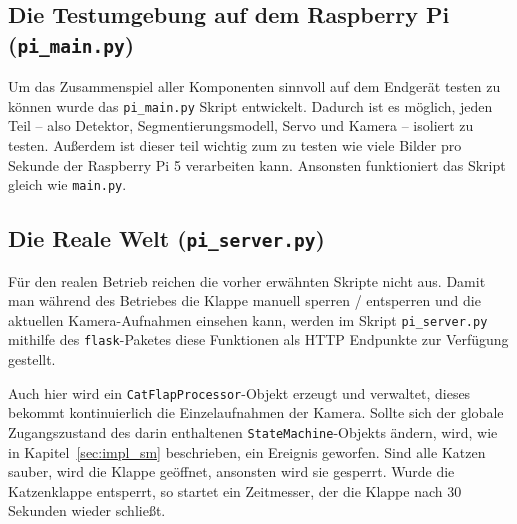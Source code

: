 \subsection{Die Testumgebung auf dem Raspberry Pi (\texttt{pi\_main.py})}
Um das Zusammenspiel aller Komponenten sinnvoll auf dem Endgerät testen zu können wurde das \texttt{pi\_main.py} Skript entwickelt. Dadurch ist es möglich, jeden Teil – also Detektor, Segmentierungsmodell, Servo und Kamera – isoliert zu testen. Außerdem ist dieser teil wichtig zum zu testen wie viele Bilder pro Sekunde der Raspberry Pi 5 verarbeiten kann. Ansonsten funktioniert das Skript gleich wie \texttt{main.py}.

\subsection{Die Reale Welt (\texttt{pi\_server.py})}
Für den realen Betrieb reichen die vorher erwähnten Skripte nicht aus. Damit man während des Betriebes die Klappe manuell sperren / entsperren und die aktuellen Kamera-Aufnahmen einsehen kann, werden im Skript \texttt{pi\_server.py} mithilfe des \texttt{flask}-Paketes diese Funktionen als HTTP Endpunkte zur Verfügung gestellt.

Auch hier wird ein \texttt{CatFlapProcessor}-Objekt erzeugt und verwaltet, dieses bekommt kontinuierlich die Einzelaufnahmen der Kamera. Sollte sich der globale Zugangszustand des darin enthaltenen \texttt{StateMachine}-Objekts ändern, wird, wie in Kapitel~\ref{sec:impl_sm} beschrieben, ein Ereignis geworfen. Sind alle Katzen sauber, wird die Klappe geöffnet, ansonsten wird sie gesperrt. Wurde die Katzenklappe entsperrt, so startet ein Zeitmesser, der die Klappe nach 30 Sekunden wieder schließt.




